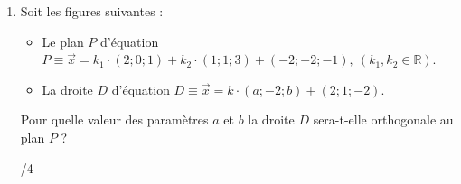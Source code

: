 \begin{enumerate}
		\item 
			\begin{minipage}[t]{.9\textwidth}
				Soit les figures suivantes :
				\begin{itemize}
					\item Le plan $P$ d'équation $P \equiv \vec{x} = k_1 \cdot \left(2; 0; 1\right) + k_2 \cdot \left(1; 1; 3\right) + \left(-2; -2; -1\right), ~(k_1, k_2 \in \mathbb{R})$.
					\item La droite $D$ d'équation $D \equiv \vec{x} = k \cdot \left(a; -2; b\right) + \left(2; 1; -2\right)$.
				\end{itemize}
				Pour quelle valeur des paramètres $a$ et $b$ la droite $D$ sera-t-elle orthogonale au plan $P$ ?
			\end{minipage}%
			\begin{minipage}{.1\textwidth}
				\begin{flushright}
					{\large /4}
				\end{flushright}
			\end{minipage}
			
	\end{enumerate}
	
